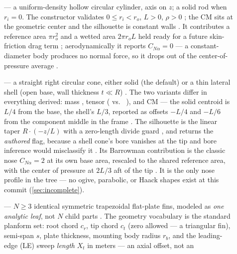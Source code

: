 \begin{description}
\item[] --- a uniform-density hollow circular cylinder, axis on $z$; a solid
  rod when $r_i = 0$. The constructor validates $0 \le r_i < r_o$, $L > 0$, $\rho > 0$
  ; the CM sits at the geometric center
   and the silhouette
  is constant walls . It contributes a reference area
  $\pi r_o^2$  and a wetted area $2\pi r_o L$ held ready for
  a future skin-friction drag term ; aerodynamically it
  reports $C_{N\alpha} = 0$ --- a constant-diameter body produces no normal force, so it
  drops out of the center-of-pressure average .
\item[] --- a straight right circular cone, either solid (the default)
  or a thin lateral shell (open base, wall thickness $t \ll R$)
  . The two variants differ in everything derived:
  mass , tensor
  ( vs.\  ), and
  CM --- the solid centroid is $L/4$ from the base, the shell's $L/3$, reported as offsets
  $-L/4$ and $-L/6$ from the component middle in the \zfwd{} frame
  . The silhouette is the linear taper
  $R\cdot(-z/L)$ with a zero-length divide guard , and
   returns the \emph{authored} flag, because a shell cone's bore vanishes at
  the tip and bore inference would misclassify it
  . Its Barrowman contribution is the classic nose
  $C_{N\alpha} = 2$ at its own base area, rescaled to the shared reference area, with the
  center of pressure at $2L/3$ aft of the tip . It is
  the only nose profile in the tree --- no ogive, parabolic, or Haack shapes exist at this
  commit (\cref{sec:incomplete}).
\item[] --- $N \ge 3$ identical symmetric trapezoidal flat-plate fins, modeled
  as \emph{one analytic leaf}, not $N$ child parts . The
  geometry vocabulary is the standard planform set: root chord $c_r$, tip chord $c_t$ (zero
  allowed --- a triangular fin), semi-span $s$, plate thickness, mounting body radius $r_b$,
  and the leading-edge (LE) sweep \emph{length} $X_t$ in meters --- an axial offset, not an

\end{description}
